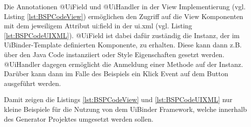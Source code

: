 Die Annotationen @UiField und @UiHandler in der View Implementierung (vgl.
Listing \ref{lst:BSPCodeView}) ermöglichen den Zugriff auf die View Komponenten
mit dem jeweiligem Attribut ui:field in der ui.xml (vgl. Listing
\ref{lst:BSPCodeUIXML}). @UiField ist dabei dafür zuständig die Instanz, der im
UiBinder-Template definierten Komponente, zu erhalten. Diese kann dann z.B. über
den Java Code instanziiert oder Style Eigenschaften gesetzt werden. @UiHandler
dagegen ermöglicht die Anmeldung einer Methode auf der Instanz.
Darüber kann dann im Falle des Beispiels ein Klick Event auf dem Button ausgeführt werden.

Damit zeigen die Listings \ref{lst:BSPCodeView} und \ref{lst:BSPCodeUIXML}
nur kleine Beispiele für die Nutzung von dem UiBinder Framework, welche
innerhalb des Generator Projektes umgesetzt werden sollen.



